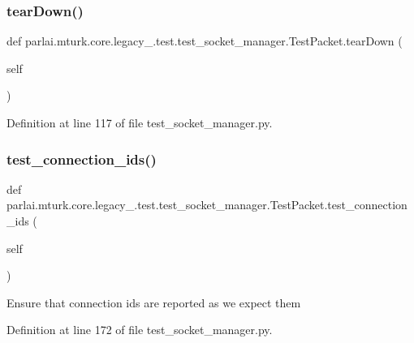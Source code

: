 \subsubsection{\texorpdfstring{tear\+Down()}{tearDown()}}
{\footnotesize\ttfamily def parlai.\+mturk.\+core.\+legacy\+\_.\+test.\+test\+\_\+socket\+\_\+manager.\+Test\+Packet.\+tear\+Down (\begin{DoxyParamCaption}\item[{}]{self }\end{DoxyParamCaption})}



Definition at line 117 of file test\+\_\+socket\+\_\+manager.\+py.

\mbox{\label{classparlai_1_1mturk_1_1core_1_1legacy__2018_1_1test_1_1test__socket__manager_1_1TestPacket_a952b78e6a82d418c4625d0aa2848b1a4}} 
\subsubsection{\texorpdfstring{test\+\_\+connection\+\_\+ids()}{test\_connection\_ids()}}
{\footnotesize\ttfamily def parlai.\+mturk.\+core.\+legacy\+\_.\+test.\+test\+\_\+socket\+\_\+manager.\+Test\+Packet.\+test\+\_\+connection\+\_\+ids (\begin{DoxyParamCaption}\item[{}]{self }\end{DoxyParamCaption})}

\begin{DoxyVerb}Ensure that connection ids are reported as we expect them\end{DoxyVerb}
 

Definition at line 172 of file test\+\_\+socket\+\_\+manager.\+py.



